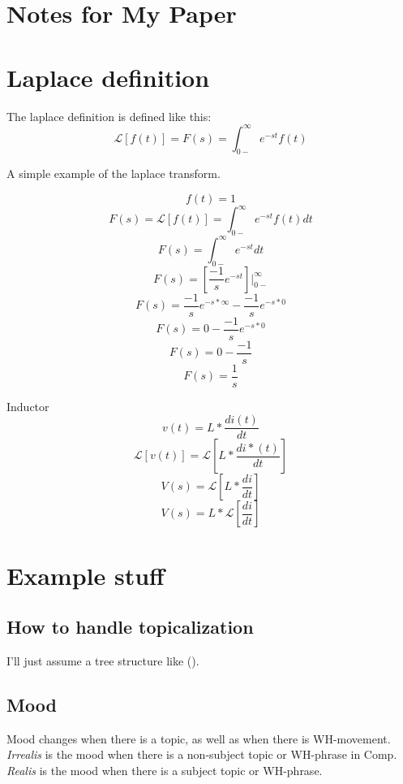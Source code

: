 \documentclass[12pt]{article}
\begin{document}
\section*{Notes for My Paper}

\section*{Laplace definition}
The laplace definition is defined like this: \[\mathcal{L}[f(t)] = F(s) = \int_{0-}^{\infty} e^{-st} f(t)\]

A simple example of the laplace transform.

\[f(t) = 1\]
\[F(s) = \mathcal{L}[f(t)] = \int_{0-}^{\infty} e^{-st} f(t) dt\]
\[F(s) = \int_{0-}^{\infty} e^{-st} dt\]
\[F(s) = [ \frac{-1}{s} e^{-st} ] |_{0-}^{\infty}\]
\[F(s) = \frac{-1}{s}e^{-s * \infty} - \frac{-1}{s}e^{-s*0}\]
\[F(s) = 0 - \frac{-1}{s}e^{-s*0}\]
\[F(s) = 0 - \frac{-1}{s}\]
\[F(s) = \frac{1}{s}\]

Inductor
\[v(t) = L * \frac{di(t)}{dt}\]
\[\mathcal{L}[v(t)] = \mathcal{L}[L * \frac{di*(t)}{dt}]\]
\[V(s) =  \mathcal{L}[L * \frac{di}{dt}]\]
\[V(s) =  L * \mathcal{L}[\frac{di}{dt}]\]


\section*{Example stuff}

{\small
{}
}

\subsection*{How to handle topicalization}

I'll just assume a tree structure like ().

{\small
{}
}

\subsection*{Mood}

Mood changes when there is a topic, as well as when
there is WH-movement.  \emph{Irrealis} is the mood when
there is a non-subject topic or WH-phrase in Comp.
\emph{Realis} is the mood when there is a subject topic
or WH-phrase.
\end{document}
